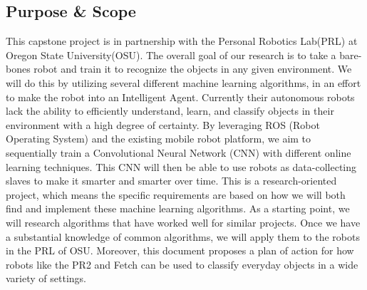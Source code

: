 \documentclass[draftclsnofoot, onecolumn, 10pt, compsoc]{IEEEtran}
\begin{document}
\subsection{Purpose \& Scope}
This capstone project is in partnership with the Personal Robotics Lab(PRL) at Oregon State University(OSU). The overall goal of our research is to take a bare-bones robot and train it to recognize the objects in any given environment. We will do this by utilizing several different machine learning algorithms, in an effort to make the robot into an Intelligent Agent. Currently their autonomous robots lack the ability to efficiently understand, learn, and classify objects in their environment with a high degree of certainty. By leveraging ROS (Robot Operating System) and the existing mobile robot platform, we aim to sequentially train a Convolutional Neural Network (CNN) with different online learning techniques. This CNN will then be able to use robots as data-collecting slaves to make it smarter and smarter over time. 
	This is a research-oriented project, which means the specific requirements are based on how we will both find and implement these machine learning algorithms. As a starting point, we will research algorithms that have worked well for similar projects. Once we have a substantial knowledge of common algorithms, we will apply them to the robots in the PRL of OSU. Moreover, this document proposes a plan of action for how robots like the PR2 and Fetch can be used to classify everyday objects in a wide variety of settings.
\end{document}
